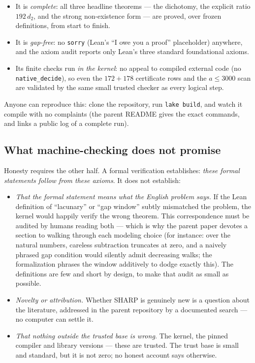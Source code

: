 \documentclass[11pt,reqno]{amsart}
\theoremstyle{plain}
\theoremstyle{definition}
\theoremstyle{remark}
\begin{document}
\begin{itemize}
\item It is \emph{complete}: all three headline theorems --- the dichotomy, the
      explicit ratio $192\,d_2$, and the strong non-existence form --- are
      proved, over frozen definitions, from start to finish.
\item It is \emph{gap-free}: no \texttt{sorry} (Lean's ``I owe you a proof''
      placeholder) anywhere, and the axiom audit reports only Lean's three
      standard foundational axioms.
\item Its finite checks run \emph{in the kernel}: no appeal to compiled
      external code (no \texttt{native\_decide}), so even the $172 + 178$
      certificate rows and the $a \le 3000$ scan are validated by the same
      small trusted checker as every logical step.
\end{itemize}

Anyone can reproduce this: clone the repository, run \texttt{lake build}, and
watch it compile with no complaints (the parent README gives the exact
commands, and links a public log of a complete run).

\subsection{What machine-checking does not promise}

Honesty requires the other half. A formal verification establishes: \emph{these
formal statements follow from these axioms}. It does not establish:

\begin{itemize}
\item \emph{That the formal statement means what the English problem says.} If
      the Lean definition of ``lacunary'' or ``gap window'' subtly mismatched
      the problem, the kernel would happily verify the wrong theorem. This
      correspondence must be audited by humans reading both --- which is why
      the parent paper devotes a section to walking through each modeling
      choice (for instance: over the natural numbers, careless subtraction
      truncates at zero, and a naively phrased gap condition would silently
      admit decreasing walks; the formalization phrases the window additively
      to dodge exactly this). The definitions are few and short by design, to
      make that audit as small as possible.
\item \emph{Novelty or attribution.} Whether SHARP is genuinely new is a
      question about the literature, addressed in the parent repository by a
      documented search --- no computer can settle it.
\item \emph{That nothing outside the trusted base is wrong.} The kernel, the
      pinned compiler and library versions --- these are trusted. The trust
      base is small and standard, but it is not zero; no honest account says
      otherwise.
\end{itemize}
\end{document}
